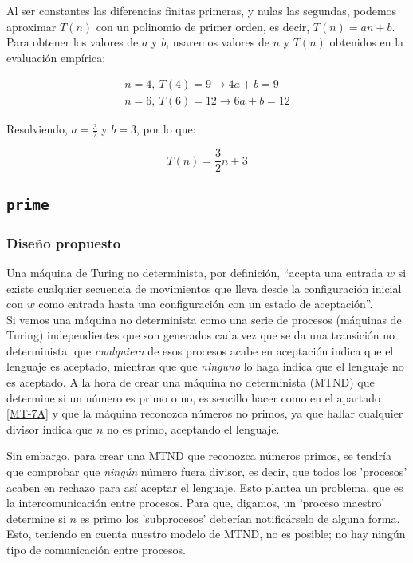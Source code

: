 Al ser constantes las diferencias finitas primeras, y nulas las segundas, podemos aproximar $T(n)$ con un polinomio de primer orden, es decir, $T(n) = an + b$.\\

Para obtener los valores de $a$ y $b$, usaremos valores de $n$ y $T(n)$ obtenidos en la evaluación empírica:

\begin{subequations}
    \begin{gather}
        n = 4,\ T(4) = 9  \rightarrow 4a + b = 9 \\
        n = 6,\ T(6) = 12 \rightarrow 6a + b = 12
    \end{gather}
\end{subequations}


Resolviendo, $a=\frac{3}{2}$ y $b=3$, por lo que:

\begin{equation}
    T(n) = \frac{3}{2}n + 3
\end{equation}



\subsection{\texttt{prime}}

\subsubsection*{Diseño propuesto}
Una máquina de Turing no determinista, por definición, ``acepta una
entrada $w$ si existe cualquier secuencia de movimientos que lleva desde la configuración inicial con $w$ como entrada hasta una configuración con un estado de aceptación''.\parencite[][pg. 289]{HopcroftJohnE.2008Ialt}\\
Si vemos una máquina no determinista como una serie de procesos (máquinas de Turing) independientes que son generados cada vez que se da una transición no determinista, que \textit{cualquiera} de esos procesos acabe en aceptación indica que el lenguaje es aceptado, mientras que que \textit{ninguno} lo haga indica que el lenguaje no es aceptado. A la hora de crear una máquina no determinista (MTND) que determine si un número es primo o no, es sencillo hacer como en el apartado \ref{MT-7A} y que la máquina reconozca números no primos, ya que hallar cualquier divisor indica que $n$ no es primo, aceptando el lenguaje.\medskip

Sin embargo, para crear una MTND que reconozca números primos, se tendría que comprobar que \textit{ningún} número fuera divisor, es decir, que todos los 'procesos' acaben en rechazo para así aceptar el lenguaje. Esto plantea un problema, que es la intercomunicación entre procesos. Para que, digamos, un 'proceso maestro' determine si $n$ es primo los 'subprocesos' deberían notificárselo de alguna forma.\\
Esto, teniendo en cuenta nuestro modelo de MTND, no es posible; no hay ningún tipo de comunicación entre procesos.\medskip

